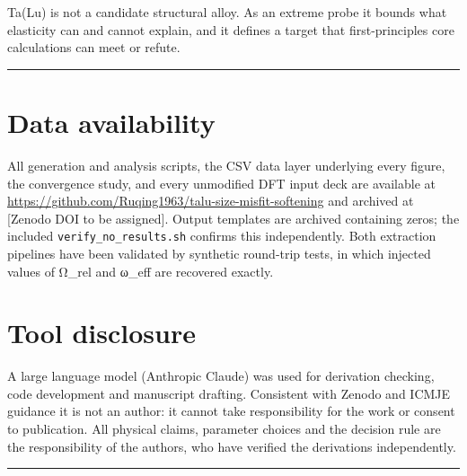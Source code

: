 \documentclass[11pt,a4paper]{article}
\begin{document}
Ta(Lu) is not a candidate structural alloy. As an extreme probe it bounds what elasticity can and cannot explain, and it defines a target that first-principles core calculations can meet or refute.

\begin{center}\rule{0.5\linewidth}{0.5pt}\end{center}

\hypertarget{data-availability}{%
\section*{Data availability}\label{sec:data-availability}}

All generation and analysis scripts, the CSV data layer underlying every figure, the convergence study, and every unmodified DFT input deck are available at \url{https://github.com/Ruqing1963/talu-size-misfit-softening} and archived at {[}Zenodo DOI to be assigned{]}. Output templates are archived containing zeros; the included \texttt{verify\_no\_results.sh} confirms this independently. Both extraction pipelines have been validated by synthetic round-trip tests, in which injected values of Ω\_rel and ω\_eff are recovered exactly.

\hypertarget{tool-disclosure}{%
\section*{Tool disclosure}\label{sec:tool-disclosure}}

A large language model (Anthropic Claude) was used for derivation checking, code development and manuscript drafting. Consistent with Zenodo and ICMJE guidance it is not an author: it cannot take responsibility for the work or consent to publication. All physical claims, parameter choices and the decision rule are the responsibility of the authors, who have verified the derivations independently.

\begin{center}\rule{0.5\linewidth}{0.5pt}\end{center}



\end{document}
